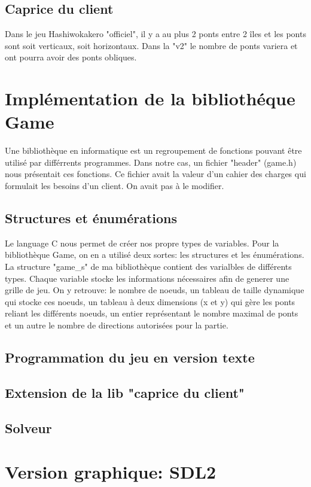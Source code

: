 \documentclass{article}
\begin{document}
	\subsection{Caprice du client}
	Dans le jeu Hashiwokakero "officiel", il y a au plus 2 ponts entre 2 \^iles et les ponts sont soit verticaux, soit horizontaux. Dans la "v2" le nombre de ponts variera et ont pourra avoir des ponts obliques.

\section{Impl\'ementation de la biblioth\'eque Game}
Une biblioth\`eque en informatique est un regroupement de fonctions pouvant \^etre utilis\'e par diff\'errents programmes. Dans notre cas, un fichier "header" (game.h) nous pr\'esentait ces fonctions. Ce fichier avait la valeur d'un cahier des charges qui formulait les besoins d'un client. On avait pas \`a le modifier.
	\subsection{Structures et \'enum\'erations}
	Le language C nous permet de cr\'eer nos propre types de variables. Pour la biblioth\`eque Game, on en a utilis\'e deux sortes: les structures et les \'enum\'erations. 
	\newline La structure "game\_s" de ma biblioth\`eque contient des varialbles de diff\'erents types. Chaque variable stocke les informations n\'ecessaires afin de generer une grille de jeu. On y retrouve: le nombre de noeuds, un tableau de taille dynamique qui stocke ces noeuds, un tableau \`a deux dimensions (x et y)  qui g\`ere les ponts reliant les diff\'erents noeuds, un entier repr\'esentant le nombre maximal de ponts et un autre le nombre de directions autoris\'ees pour la partie. 
		
	\subsection{Programmation du jeu en version texte}
	\subsection{Extension de la lib "caprice du client"}
	\subsection{Solveur}
\section{Version graphique: SDL2}
\newpage
\end{document}

